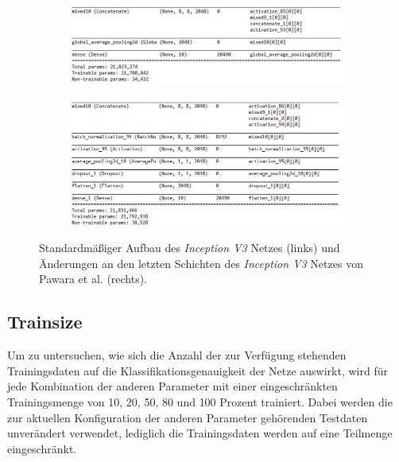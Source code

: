 \begin{figure}[H]

\begin{minipage}{.5\textwidth}
\begin{figure}[H]
\begin{adjustbox}{width=\textwidth, center}
\includegraphics[scale=1]{img/3_inception-standard.jpg}
\end{adjustbox}
\end{figure}
\end{minipage}%
\begin{minipage}{.5\textwidth}
\begin{figure}[H]
\begin{adjustbox}{width=\textwidth, center}
\includegraphics[scale=1]{img/3_inception-pawara.jpg}
\end{adjustbox}

\end{figure}
\end{minipage}
\caption{Standardmäßiger Aufbau des \textit{Inception V3} Netzes (links) und Änderungen an den letzten Schichten des \textit{Inception V3} Netzes von Pawara et al. \cite{pawaraWebsiteCode, pawaraPaper} (rechts).}
\label{fig:inceptionAenderungen}
\end{figure}


\subsection{Trainsize}
Um zu untersuchen, wie sich die Anzahl der zur Verfügung stehenden Trainingsdaten auf die Klassifikationsgenauigkeit der Netze auswirkt, wird für jede Kombination der anderen Parameter mit einer eingeschränkten Trainingsmenge von 10, 20, 50, 80 und 100 Prozent trainiert. Dabei werden die zur aktuellen Konfiguration der anderen Parameter gehörenden Testdaten unverändert verwendet, lediglich die Trainingsdaten werden auf eine Teilmenge eingeschränkt.\\

